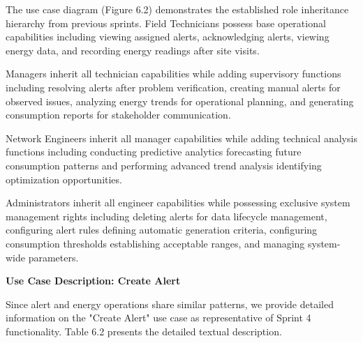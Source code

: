 The use case diagram (Figure 6.2) demonstrates the established role inheritance hierarchy from previous sprints. Field Technicians possess base operational capabilities including viewing assigned alerts, acknowledging alerts, viewing energy data, and recording energy readings after site visits.

Managers inherit all technician capabilities while adding supervisory functions including resolving alerts after problem verification, creating manual alerts for observed issues, analyzing energy trends for operational planning, and generating consumption reports for stakeholder communication.

Network Engineers inherit all manager capabilities while adding technical analysis functions including conducting predictive analytics forecasting future consumption patterns and performing advanced trend analysis identifying optimization opportunities.

Administrators inherit all engineer capabilities while possessing exclusive system management rights including deleting alerts for data lifecycle management, configuring alert rules defining automatic generation criteria, configuring consumption thresholds establishing acceptable ranges, and managing system-wide parameters.

\textbf{Use Case Description: Create Alert}

Since alert and energy operations share similar patterns, we provide detailed information on the "Create Alert" use case as representative of Sprint 4 functionality. Table 6.2 presents the detailed textual description.

